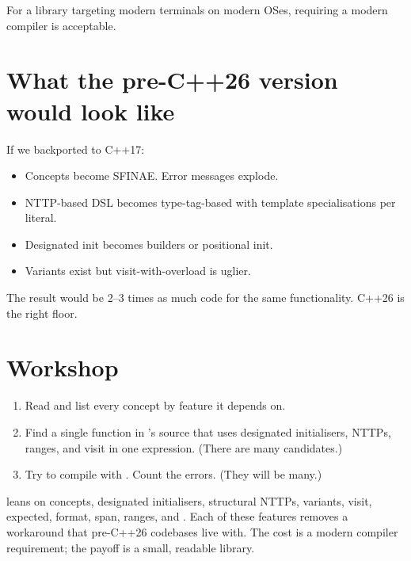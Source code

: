 For a library targeting modern terminals on modern OSes,
requiring a modern compiler is acceptable.

\section{What the pre-C++26 version would look like}

If we backported \maya{} to C++17:

\begin{itemize}[leftmargin=*]
  \item Concepts become SFINAE. Error messages explode.
  \item NTTP-based DSL becomes type-tag-based with
    template specialisations per literal.
  \item Designated init becomes builders or positional init.
  \item Variants exist but visit-with-overload is uglier.
\end{itemize}

The result would be 2--3 times as much code for the same
functionality. C++26 is the right floor.

\section*{Workshop}

\begin{enumerate}[leftmargin=*]
  \item Read  and
    list every concept by feature it depends on.
  \item Find a single function in \maya{}'s source that uses
    designated initialisers, NTTPs, ranges, and visit in one
    expression. (There are many candidates.)
  \item Try to compile \maya{} with . Count the
    errors. (They will be many.)
\end{enumerate}

\begin{recap}
\maya{} leans on concepts, designated initialisers, structural
NTTPs, variants, visit, expected, format, span, ranges, and
. Each of these features removes a workaround
that pre-C++26 codebases live with. The cost is a modern
compiler requirement; the payoff is a small, readable library.
\end{recap}
